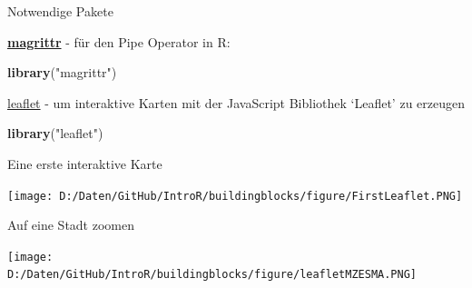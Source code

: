 \documentclass[ignorenonframetext,]{beamer}
\newenvironment{Shaded}{\begin{snugshade}}{\end{snugshade}}
\newcommand{\KeywordTok}[1]{\textcolor[rgb]{0.26,0.66,0.93}{\textbf{#1}}}
\newcommand{\DataTypeTok}[1]{\textcolor[rgb]{0.74,0.68,0.62}{\underline{#1}}}
\newcommand{\FloatTok}[1]{\textcolor[rgb]{0.27,0.67,0.26}{#1}}
\newcommand{\StringTok}[1]{\textcolor[rgb]{0.02,0.61,0.04}{#1}}
\newcommand{\OperatorTok}[1]{\textcolor[rgb]{0.74,0.68,0.62}{#1}}
\newcommand{\NormalTok}[1]{\textcolor[rgb]{0.74,0.68,0.62}{#1}}
\begin{document}
\begin{frame}[fragile]{Notwendige Pakete}

\begin{block}{\href{https://cran.r-project.org/web/packages/magrittr/index.html}{\textbf{magrittr}}
- für den Pipe Operator in R:}

\begin{Shaded}
\begin{Highlighting}[]
\KeywordTok{library}\NormalTok{(}\StringTok{"magrittr"}\NormalTok{)}
\end{Highlighting}
\end{Shaded}

\href{https://rstudio.github.io/leaflet/}{leaflet} - um interaktive
Karten mit der JavaScript Bibliothek `Leaflet' zu erzeugen

\begin{Shaded}
\begin{Highlighting}[]
\KeywordTok{library}\NormalTok{(}\StringTok{"leaflet"}\NormalTok{)}
\end{Highlighting}
\end{Shaded}

\end{block}

\end{frame}

\begin{frame}[fragile]{Eine erste interaktive Karte}

\begin{Shaded}
\end{Shaded}

\texttt{[image: D:/Daten/GitHub/IntroR/buildingblocks/figure/FirstLeaflet.PNG]}

\end{frame}

\begin{frame}[fragile]{Auf eine Stadt zoomen}

\begin{Shaded}
\end{Shaded}

\texttt{[image: D:/Daten/GitHub/IntroR/buildingblocks/figure/leafletMZESMA.PNG]}

\end{frame}
\end{document}
